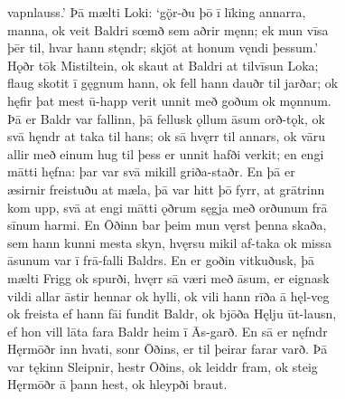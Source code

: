\documentclass[12pt,letterpaper]{book}
\begin{document}
\begin{linenumbers}
vapnlauss.'  Þā mælti Loki: `gǫ̈r-ðu þō ī līking annarra,\\
manna, ok veit Baldri sœmð sem aðrir męnn; ek mun vīsa\\
þēr til, hvar hann stęndr; skjōt at honum vęndi þessum.'\\
Hǫðr tōk Mistiltein, ok skaut at Baldri at tilvīsun Loka;\\
flaug skotit ī gęgnum hann, ok fell hann dauðr til jarðar; ok\\
hęfir þat mest ū-happ verit unnit með goðum ok mǫnnum.\\
Þā er Baldr var fallinn, þā fellusk ǫllum āsum orð-tǫk, ok\\
svā hęndr at taka til hans; ok sā hvęrr til annars, ok vāru\\
allir með einum hug til þess er unnit hafði verkit; en engi\\
mātti hęfna: þar var svā mikill griða-staðr.  En þā er\\
æsirnir freistuðu at mæla, þā var hitt þō fyrr, at grātrinn\\
kom upp, svā at engi mātti ǫðrum sęgja með orðunum frā\\
sīnum harmi.  En Ōðinn bar þeim mun vęrst þenna skaða,\\
sem hann kunni mesta skyn, hvęrsu mikil af-taka ok missa\\
āsunum var ī frā-falli Baldrs.  En er goðin vitkuðusk, þā\\
mælti Frigg ok spurði, hvęrr sā væri með āsum, er eignask\\
vildi allar āstir hennar ok hylli, ok vili hann rīða ā hęl-veg\\
ok freista ef hann fāi fundit Baldr, ok bjōða Hęlju ūt-lausn,\\
ef hon vill lāta fara Baldr heim ī Ās-garð.  En sā er nęfndr\\
Hęrmōðr inn hvati, sonr Ōðins, er til þeirar farar varð.  Þā\\
var tękinn Sleipnir, hestr Ōðins, ok leiddr fram, ok steig\\
Hęrmōðr ā þann hest, ok hleypði braut.


\end{linenumbers}
\end{document}

